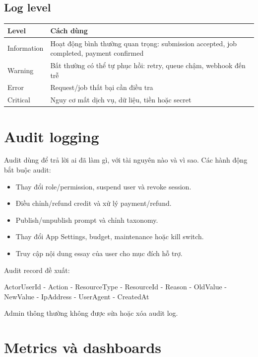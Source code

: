 \documentclass[11pt,a4paper]{article}
\begin{document}
\subsection{Log level}

\begin{longtable}{L{0.20\textwidth}L{0.72\textwidth}}
\toprule
\textbf{Level} & \textbf{Cách dùng} \\
\midrule
Information & Hoạt động bình thường quan trọng: submission accepted, job completed, payment confirmed \\
Warning & Bất thường có thể tự phục hồi: retry, queue chậm, webhook đến trễ \\
Error & Request/job thất bại cần điều tra \\
Critical & Nguy cơ mất dịch vụ, dữ liệu, tiền hoặc secret \\
\bottomrule
\end{longtable}

\section{Audit logging}

Audit dùng để trả lời ai đã làm gì, với tài nguyên nào và vì sao. Các hành động bắt buộc audit:

\begin{itemize}
  \item Thay đổi role/permission, suspend user và revoke session.
  \item Điều chỉnh/refund credit và xử lý payment/refund.
  \item Publish/unpublish prompt và chỉnh taxonomy.
  \item Thay đổi App Settings, budget, maintenance hoặc kill switch.
  \item Truy cập nội dung essay của user cho mục đích hỗ trợ.
\end{itemize}

Audit record đề xuất:

\begin{flowbox}
ActorUserId - Action - ResourceType - ResourceId - Reason - OldValue - NewValue - IpAddress - UserAgent - CreatedAt
\end{flowbox}

Admin thông thường không được sửa hoặc xóa audit log.

\section{Metrics và dashboards}
\end{document}
